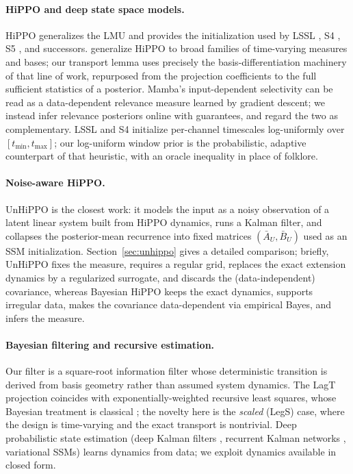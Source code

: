 \documentclass[11pt]{article}
\begin{document}
\paragraph{HiPPO and deep state space models.} HiPPO \citep{gu2020hippo} generalizes the LMU \citep{voelker2019lmu} and provides the initialization used by LSSL \citep{gu2021lssl}, S4 \citep{gu2022s4}, S5 \citep{smith2023s5}, and successors. \citet{gu2022htyh} generalize HiPPO to broad families of time-varying measures and bases; our transport lemma uses precisely the basis-differentiation machinery of that line of work, repurposed from the projection coefficients to the full sufficient statistics of a posterior. Mamba's input-dependent selectivity \citep{gu2023mamba} can be read as a data-dependent relevance measure learned by gradient descent; we instead infer relevance posteriors online with guarantees, and regard the two as complementary. LSSL and S4 initialize per-channel timescales log-uniformly over $[t_{\min},t_{\max}]$; our log-uniform window prior is the probabilistic, adaptive counterpart of that heuristic, with an oracle inequality in place of folklore.

\paragraph{Noise-aware HiPPO.} UnHiPPO \citep{lienen2025unhippo} is the closest work: it models the input as a noisy observation of a latent linear system built from HiPPO dynamics, runs a Kalman filter, and collapses the posterior-mean recurrence into fixed matrices $(\bar A_U,\bar B_U)$ used as an SSM initialization. Section~\ref{sec:unhippo} gives a detailed comparison; briefly, UnHiPPO fixes the measure, requires a regular grid, replaces the exact extension dynamics by a regularized surrogate, and discards the (data-independent) covariance, whereas Bayesian HiPPO keeps the exact dynamics, supports irregular data, makes the covariance data-dependent via empirical Bayes, and infers the measure.

\paragraph{Bayesian filtering and recursive estimation.} Our filter is a square-root information filter \citep{bierman1977,sarkka2019} whose deterministic transition is derived from basis geometry rather than assumed system dynamics. The LagT projection coincides with exponentially-weighted recursive least squares, whose Bayesian treatment is classical \citep{haykin2002adaptive}; the novelty here is the \emph{scaled} (LegS) case, where the design is time-varying and the exact transport is nontrivial. Deep probabilistic state estimation (deep Kalman filters \citep{krishnan2015dkf}, recurrent Kalman networks \citep{becker2019rkn}, variational SSMs) learns dynamics from data; we exploit dynamics available in closed form.
\end{document}
